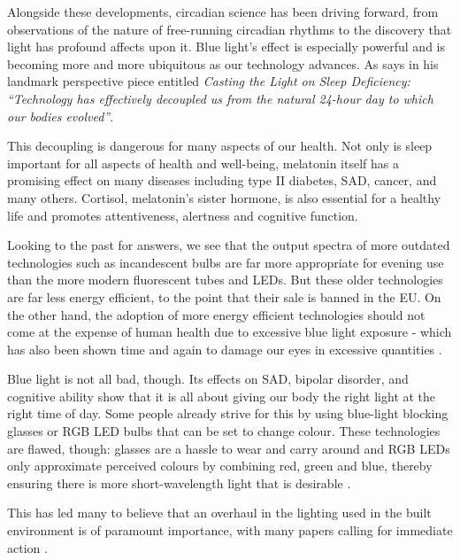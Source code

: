 Alongside these developments, circadian science has been driving forward, from observations of the nature of free-running circadian rhythms to the discovery that light has profound affects upon it. Blue light's effect is especially powerful and is becoming more and more ubiquitous as our technology advances. As \citet{czeislerPerspectiveCastingLight2013} says in his landmark perspective piece entitled \textit{Casting the Light on Sleep Deficiency: ``Technology has effectively decoupled us from the natural 24-hour day to which our bodies evolved''}. 

This decoupling is dangerous for many aspects of our health. Not only is sleep important for all aspects of health and well-being, melatonin itself has a promising effect on many diseases including type II diabetes, SAD, cancer, and many others. Cortisol, melatonin's sister hormone, is also essential for a healthy life and promotes attentiveness, alertness and cognitive function.

Looking to the past for answers, we see that the output spectra of more outdated technologies such as incandescent bulbs are far more appropriate for evening use than the more modern fluorescent tubes and LEDs. But these older technologies are far less energy efficient, to the point that their sale is banned in the EU. On the other hand, the adoption of more energy efficient technologies should not come at the expense of human health \citep{boyceReviewImpactLight2010} due to excessive blue light exposure - which has also been shown time and again to damage our eyes in excessive quantities \citep{uedaEyeDamageControl2009, kuseDamagePhotoreceptorderivedCells2014, niwanoBlueLightInjures2014, marekBlueLightPhototoxicity2018, nakamuraExposureExcessiveBlue2018}.

Blue light is not all bad, though. Its effects on SAD, bipolar disorder, and cognitive ability show that it is all about giving our body the right light at the right time of day. Some people already strive for this by using blue-light blocking glasses or RGB LED bulbs that can be set to change colour. These technologies are flawed, though: glasses are a hassle to wear and carry around and RGB LEDs only approximate perceived colours by combining red, green and blue, thereby ensuring there is more short-wavelength light that is desirable \citep{gilewskiEcologicalHarmfulnessRGB2018}.

This has led many to believe that an overhaul in the lighting used in the built environment is of paramount importance, with many papers calling for immediate action \citep{webbConsiderationsLightingBuilt2006, boyceReviewImpactLight2010, groseArtificialLightNight2014}.




